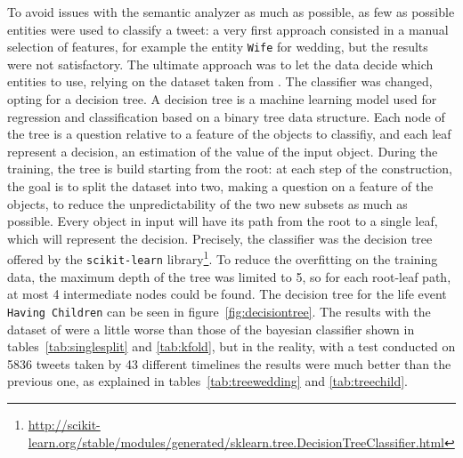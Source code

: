 To avoid issues with the semantic analyzer as much as possible, as few as possible entities were used to classify a tweet: a very first approach consisted in a manual selection of features, for example the entity \texttt{Wife} for wedding, but the results were not satisfactory. The ultimate approach was to let the data decide which entities to use, relying on the dataset taken from \cite{dickinson2015identifying}. The classifier was changed, opting for a decision tree. A decision tree is a machine learning model used for regression and classification based on a binary tree data structure. Each node of the tree is a question relative to a feature of the objects to classifiy, and each leaf represent a decision, an estimation of the value of the input object. During the training, the tree is build starting from the root: at each step of the construction, the goal is to split the dataset into two, making a question on a feature of the objects, to reduce the unpredictability of the two new subsets as much as possible. Every object in input will have its path from the root to a single leaf, which will represent the decision. Precisely, the classifier was the decision tree offered by the \texttt{scikit-learn} library\footnote{\url{http://scikit-learn.org/stable/modules/generated/sklearn.tree.DecisionTreeClassifier.html}}. To reduce the overfitting on the training data, the maximum depth of the tree was limited to 5, so for each root-leaf path, at most 4 intermediate nodes could be found. The decision tree for the life event \texttt{Having Children} can be seen in figure~\ref{fig:decisiontree}. The results with the dataset of \cite{dickinson2015identifying} were a little worse than those of the bayesian classifier shown in tables~\ref{tab:singlesplit} and \ref{tab:kfold}, but in the reality, with a test conducted on 5836 tweets taken by 43 different timelines the results were much better than the previous one, as explained in tables~\ref{tab:treewedding} and \ref{tab:treechild}.

